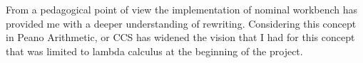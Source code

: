 \documentclass[12pt,a4paper]{article}
\begin{document}
From a pedagogical point of view the implementation of nominal
workbench has provided me with a deeper understanding of rewriting. 
Considering this concept in Peano Arithmetic, or CCS has widened the
vision that I had for this concept that was limited to lambda calculus
at the beginning of the project.











\end{document}
